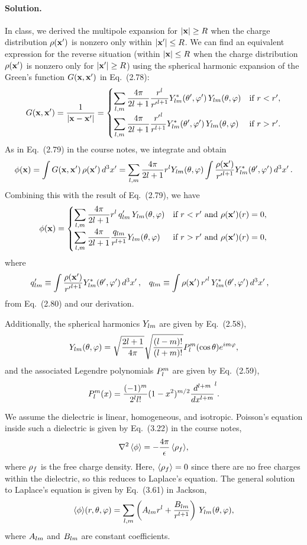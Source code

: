 \documentclass[11pt]{article}
\newcommand{\beq}{\begin{equation*}}
\newcommand{\eeq}{\end{equation*}}
\newcommand{\beqn}{\begin{equation}}
\newcommand{\eeqn}{\end{equation}}
\newenvironment{solution}
{
    \paragraph{Solution.}
    \ignorespaces
}
{
    \bigskip
}
\begin{document}
\begin{solution}
	In class, we derived the multipole expansion for $\abs{\vb{x}} \geq R$ when the charge distribution $\rho(\vb{x}')$ is nonzero only within $\abs{\vb{x}'} \leq R$.  We can find an equivalent expression for the reverse situation (within $\abs{\vb{x}} \leq R$ when the charge distribution $\rho(\vb{x}')$ is nonzero only for $\abs{\vb{x}'} \geq R$) using the spherical harmonic expansion of the Green's function $G(\vb{x}, \vb{x}')$ in Eq.~(2.78):
	\beqn \label{greenexp}
		\Gxxp = \frac{1}{\abs{\vx - \vx'}}
		= \begin{cases}
			\dsum_{l,m} \dfrac{4\pi}{2l + 1} \dfrac{r^l}{{r'}^{l + 1}} \Ylm^*\tvp \, \Ylm\tv & \tif r < r', \\[2ex]
			\dsum_{l,m} \dfrac{4\pi}{2l + 1} \dfrac{{r'}^l}{r^{l + 1}} \Ylm^*\tvp \, \Ylm\tv & \tif r > r'.
		\end{cases}
	\eeqn
	As in Eq.~(2.79) in the course notes, we integrate and obtain
	\beq
		\phix = \int \Gxxp \, \rhoxp \dcxp
		= \sum_{l, m} \frac{4\pi}{2l + 1} r^l \Ylm\tv \int \frac{\rhoxp}{{r'}^{l+1}} \Ylm^*\tvp \dcxp.
	\eeq
	Combining this with the result of Eq.~(2.79), we have
	\beqn \label{multipole}
		\phix = \begin{cases}
			\dsum_{l, m} \dfrac{4\pi}{2l + 1} r^l \, \qplm \, \Ylm\tv & \tif r < r' \text{ and } \rhoxp(r) = 0, \\[2ex]
			\dsum_{l,m} \dfrac{4\pi}{2l + 1} \dfrac{\qlm}{r^{l+1}} \Ylm\tv & \tif r > r' \text{ and } \rhoxp(r) = 0,
		\end{cases}
	\eeqn
	where
	\begin{align} \label{qlm}
		q'_{l m} &\equiv \int \frac{\rho(\vb{x}')}{{r'}^{l+1}} Y_{l m}^*(\theta', \varphi') \dd[3]{x'}, &
		q_{l m} &\equiv \int \rho(\vb{x}') \, {r'}^l \, Y_{l m}^*(\theta', \varphi') \dd[3]{x'},
	\end{align}
	from Eq.~(2.80) and our derivation.
	
	Additionally, the spherical harmonics $Y_{l m}$ are given by Eq.~(2.58),
	\beq
		\Ylm\tv = \sqrt{\frac{2l + 1}{4\pi}} \sqrt{\frac{(l - m)!}{(l + m)!}} \Plm(\cost) e^{i m \vph},
	\eeq
	and the associated Legendre polynomials $P_l^m$ are given by Eq.~(2.59),
	\beq
		\Plm(x) = \frac{(-1)^m}{2^l l!} (1 - x^2)^{m/2} \dv[l + m]{}{x} (x^2 - 1)^l.
	\eeq	
	
	We assume the dielectric is linear, homogeneous, and isotropic.  Poisson's equation inside such a dielectric is given by Eq.~(3.22) in the course notes,
	\beq
		\lap\evphi = -\frac{4\pi}{\eps} \evrhof\!,
	\eeq
	where $\rho_f$ is the free charge density.  Here, $\evrhof = 0$ since there are no free charges within the dielectric, so this reduces to Laplace's equation.  The general solution to Laplace's equation is given by Eq.~(3.61) in Jackson,
	\beqn \label{lapsol}
		\evphi\!(r, \tht, \vph) = \sum_{l,m} \left( \Alm r^l + \frac{\Blm}{r^{l+1}} \right) \, \Ylm\tv,
	\eeqn
	where $A_{l m}$ and $B_{l m}$ are constant coefficients.
	

\end{solution}
\end{document}
